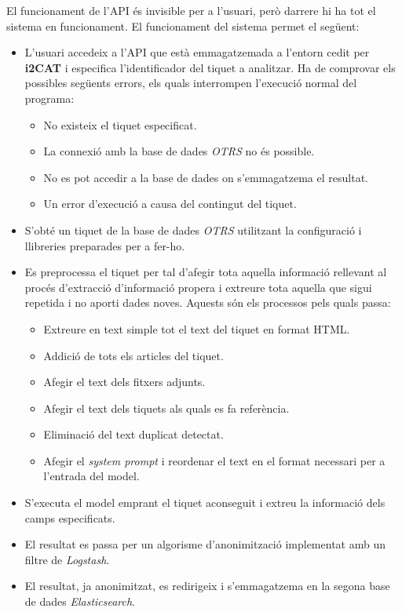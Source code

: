 El funcionament de l'API és invisible per a l'usuari, però darrere hi ha tot el sistema en funcionament. El funcionament del sistema permet el següent: 
\begin{itemize}
    \item L'usuari accedeix a l'API que està emmagatzemada a l'entorn cedit per \textbf{i2CAT} i especifica l'identificador del tiquet a analitzar. Ha de comprovar els possibles següents errors, els quals interrompen l'execució normal del programa:
    \begin{itemize}
        \item No existeix el tiquet especificat. 
        \item La connexió amb la base de dades \textit{OTRS} no és possible.
        \item No es pot accedir a la base de dades on s'emmagatzema el resultat.
        \item Un error d'execució a causa del contingut del tiquet.
    \end{itemize}
    \item S'obté un tiquet de la base de dades \textit{OTRS} utilitzant la configuració i llibreries preparades per a fer-ho.
    \item Es preprocessa el tiquet per tal d'afegir tota aquella informació rellevant al procés d'extracció d'informació propera i extreure tota aquella que sigui repetida i no aporti dades noves. Aquests són els processos pels quals passa:
    \begin{itemize}
        \item Extreure en text simple tot el text del tiquet en format HTML.
        \item Addició de tots els articles del tiquet.
        \item Afegir el text dels fitxers adjunts.
        \item Afegir el text dels tiquets als quals es fa referència.
        \item Eliminació del text duplicat detectat.
        \item Afegir el \textit{system prompt} i reordenar el text en el format necessari per a l'entrada del model.
    \end{itemize}
    \item S'executa el model emprant el tiquet aconseguit i extreu la informació dels camps especificats.
    \item El resultat es passa per un algorisme d'anonimització implementat amb un filtre de \textit{Logstash}.
    \item El resultat, ja anonimitzat, es redirigeix i s'emmagatzema en la segona base de dades \textit{Elasticsearch}.
\end{itemize}


